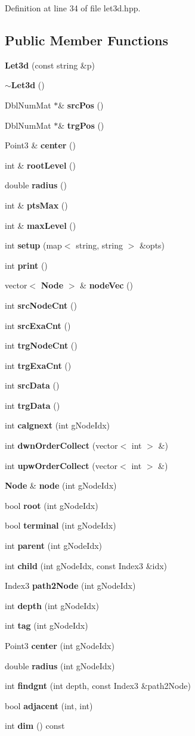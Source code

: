 Definition at line 34 of file let3d.hpp.\subsection*{Public Member Functions}
\begin{CompactItemize}
\item 
{\bf Let3d} (const string \&p)
\item 
{\bf $\sim$Let3d} ()
\item 
Dbl\-Num\-Mat $\ast$\& {\bf src\-Pos} ()
\item 
Dbl\-Num\-Mat $\ast$\& {\bf trg\-Pos} ()
\item 
Point3 \& {\bf center} ()
\item 
int \& {\bf root\-Level} ()
\item 
double {\bf radius} ()
\item 
int \& {\bf pts\-Max} ()
\item 
int \& {\bf max\-Level} ()
\item 
int {\bf setup} (map$<$ string, string $>$ \&opts)
\item 
int {\bf print} ()
\item 
vector$<$ {\bf Node} $>$ \& {\bf node\-Vec} ()
\item 
int {\bf src\-Node\-Cnt} ()
\item 
int {\bf src\-Exa\-Cnt} ()
\item 
int {\bf trg\-Node\-Cnt} ()
\item 
int {\bf trg\-Exa\-Cnt} ()
\item 
int {\bf src\-Data} ()
\item 
int {\bf trg\-Data} ()
\item 
int {\bf calgnext} (int g\-Node\-Idx)
\item 
int {\bf dwn\-Order\-Collect} (vector$<$ int $>$ \&)
\item 
int {\bf upw\-Order\-Collect} (vector$<$ int $>$ \&)
\item 
{\bf Node} \& {\bf node} (int g\-Node\-Idx)
\item 
bool {\bf root} (int g\-Node\-Idx)
\item 
bool {\bf terminal} (int g\-Node\-Idx)
\item 
int {\bf parent} (int g\-Node\-Idx)
\item 
int {\bf child} (int g\-Node\-Idx, const Index3 \&idx)
\item 
Index3 {\bf path2Node} (int g\-Node\-Idx)
\item 
int {\bf depth} (int g\-Node\-Idx)
\item 
int {\bf tag} (int g\-Node\-Idx)
\item 
Point3 {\bf center} (int g\-Node\-Idx)
\item 
double {\bf radius} (int g\-Node\-Idx)
\item 
int {\bf findgnt} (int depth, const Index3 \&path2Node)
\item 
bool {\bf adjacent} (int, int)
\item 
int {\bf dim} () const 
\end{CompactItemize}
